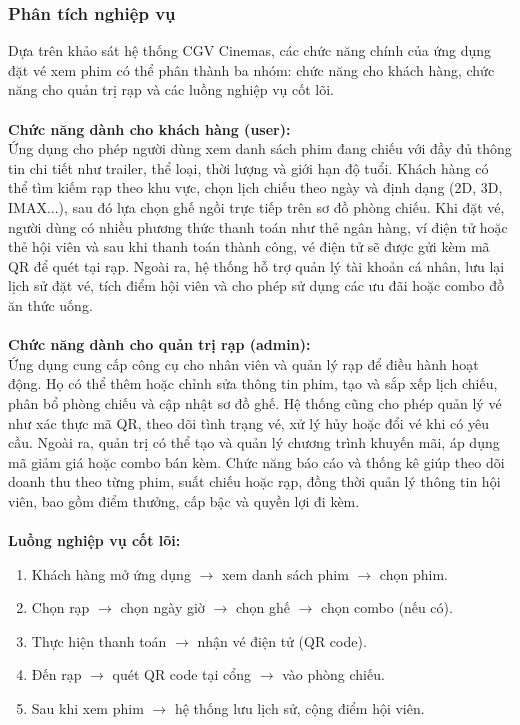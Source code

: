 \documentclass[a4paper]{article}
\newcommand{\cach}{\hspace*{1.5em}\ignorespaces}
\begin{document}
\subsubsection{Phân tích nghiệp vụ}
\cach Dựa trên khảo sát hệ thống CGV Cinemas, các chức năng chính của ứng dụng đặt vé xem phim có thể phân thành ba nhóm: chức năng cho khách hàng, chức năng cho quản trị rạp và các luồng nghiệp vụ cốt lõi.
\\
\\
\cach \textbf{Chức năng dành cho khách hàng (user):} 
\\
\cach Ứng dụng cho phép người dùng xem danh sách phim đang chiếu với đầy đủ thông tin chi tiết như trailer, thể loại, thời lượng và giới hạn độ tuổi. Khách hàng có thể tìm kiếm rạp theo khu vực, chọn lịch chiếu theo ngày và định dạng (2D, 3D, IMAX...), sau đó lựa chọn ghế ngồi trực tiếp trên sơ đồ phòng chiếu. Khi đặt vé, người dùng có nhiều phương thức thanh toán như thẻ ngân hàng, ví điện tử hoặc thẻ hội viên và sau khi thanh toán thành công, vé điện tử sẽ được gửi kèm mã QR để quét tại rạp. Ngoài ra, hệ thống hỗ trợ quản lý tài khoản cá nhân, lưu lại lịch sử đặt vé, tích điểm hội viên và cho phép sử dụng các ưu đãi hoặc combo đồ ăn thức uống.
\\
\\
\cach \textbf{Chức năng dành cho quản trị rạp (admin):}
\\
\cach Ứng dụng cung cấp công cụ cho nhân viên và quản lý rạp để điều hành hoạt động. Họ có thể thêm hoặc chỉnh sửa thông tin phim, tạo và sắp xếp lịch chiếu, phân bổ phòng chiếu và cập nhật sơ đồ ghế. Hệ thống cũng cho phép quản lý vé như xác thực mã QR, theo dõi tình trạng vé, xử lý hủy hoặc đổi vé khi có yêu cầu. Ngoài ra, quản trị có thể tạo và quản lý chương trình khuyến mãi, áp dụng mã giảm giá hoặc combo bán kèm. Chức năng báo cáo và thống kê giúp theo dõi doanh thu theo từng phim, suất chiếu hoặc rạp, đồng thời quản lý thông tin hội viên, bao gồm điểm thưởng, cấp bậc và quyền lợi đi kèm.
\\
\\
\cach \textbf{Luồng nghiệp vụ cốt lõi:}
\begin{enumerate}
    \item Khách hàng mở ứng dụng $\rightarrow$ xem danh sách phim $\rightarrow$ chọn phim.
    \item Chọn rạp $\rightarrow$ chọn ngày giờ $\rightarrow$ chọn ghế $\rightarrow$ chọn combo (nếu có).
    \item Thực hiện thanh toán $\rightarrow$ nhận vé điện tử (QR code).
    \item Đến rạp $\rightarrow$ quét QR code tại cổng $\rightarrow$ vào phòng chiếu.
    \item Sau khi xem phim $\rightarrow$ hệ thống lưu lịch sử, cộng điểm hội viên.
\end{enumerate}
\end{document}
